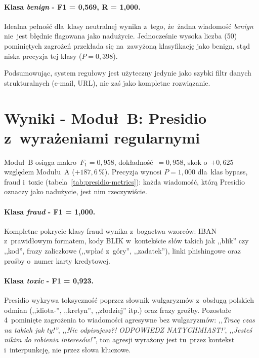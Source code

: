 \paragraph{Klasa \textit{benign} - F1 = 0{,}569, R = 1{,}000.}
Idealna pełność dla~klasy neutralnej wynika z~tego, że~żadna wiadomość
\textit{benign} nie~jest błędnie flagowana jako nadużycie.
Jednocześnie wysoka liczba (50) pominiętych zagrożeń przekłada się na~zawyżoną
klasyfikację jako benign, stąd niska precyzja tej klasy ($P = 0{,}398$).

Podsumowując, system regułowy jest użyteczny jedynie jako szybki filtr danych
strukturalnych (e-mail, URL), nie zaś jako kompletne rozwiązanie.

\section{Wyniki - Moduł~B: Presidio z~wyrażeniami regularnymi}
\label{sec:wyniki-presidio}



Moduł~B osiąga makro~$F_1 = 0{,}958$, dokładność~$= 0{,}958$,
skok o~$+0{,}625$ względem Modułu~A ($+187{,}6\,\%$).
Precyzja wynosi $P = 1{,}000$ dla~klas bypass, fraud i~toxic
(tabela~\ref{tab:presidio-metrics}): każda wiadomość, którą Presidio
oznaczy jako nadużycie, jest nim rzeczywiście.

\paragraph{Klasa \textit{fraud} - F1 = 1{,}000.}
Kompletne pokrycie klasy fraud wynika z~bogactwa wzorców:
IBAN z~prawidłowym formatem, kody BLIK w~kontekście słów takich jak
,,blik'' czy ,,kod'', frazy zaliczkowe (,,wpłać z~góry'', ,,zadatek''),
linki phishingowe oraz prośby o~numer karty kredytowej.

\paragraph{Klasa \textit{toxic} - F1 = 0{,}923.}
Presidio wykrywa toksyczność poprzez słownik wulgaryzmów z~obsługą polskich
odmian (,,idiota-'', ,,kretyn'', ,,złodziej'' itp.) oraz frazy groźby.
Pozostałe 4~pominięte zagrożenia to wiadomości agresywne bez wulgaryzmów:
\textit{,,Tracę czas na takich jak ty!''},
\textit{,,Nie odpisujesz?! ODPOWIEDZ NATYCHMIAST!'},
\textit{,,Jesteś nikim do robienia interesów!''},
ton agresji wyrażony jest tu~przez kontekst i~interpunkcję, nie przez słowa kluczowe.

